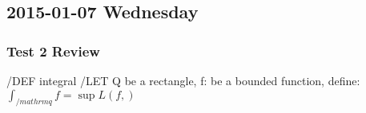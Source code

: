 \subsection{2015-01-07 Wednesday}
\subsubsection{Test 2 Review}
/DEF integral
/LET Q be a rectangle, f:\to{} be a bounded function, define:
$\int_{/mathrm{q}} f = \sup{\mathit{L}(f, )}$

